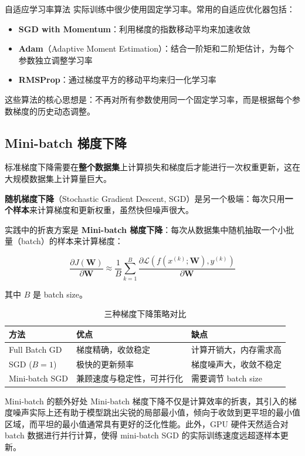 \documentclass[a4paper]{article}
\begin{document}
\begin{importantbox}{自适应学习率算法}
实际训练中很少使用固定学习率。常用的自适应优化器包括：
\begin{itemize}
\item \textbf{SGD with Momentum}：利用梯度的指数移动平均来加速收敛
\item \textbf{Adam}（Adaptive Moment Estimation）：结合一阶矩和二阶矩估计，为每个参数独立调整学习率
\item \textbf{RMSProp}：通过梯度平方的移动平均来归一化学习率
\end{itemize}
这些算法的核心思想是：不再对所有参数使用同一个固定学习率，而是根据每个参数梯度的历史动态调整。
\end{importantbox}

\subsection{Mini-batch 梯度下降}

标准梯度下降需要在\textbf{整个数据集}上计算损失和梯度后才能进行一次权重更新，这在大规模数据集上计算量巨大。

\textbf{随机梯度下降}（Stochastic Gradient Descent, SGD）是另一个极端：每次只用\textbf{一个样本}来计算梯度和更新权重，虽然快但噪声很大。

实践中的折衷方案是 \textbf{Mini-batch 梯度下降}：每次从数据集中随机抽取一个小批量（batch）的样本来计算梯度：

$$\frac{\partial J(\mathbf{W})}{\partial \mathbf{W}} \approx \frac{1}{B}\sum_{k=1}^{B}\frac{\partial \mathcal{L}(f(x^{(k)}; \mathbf{W}), y^{(k)})}{\partial \mathbf{W}}$$

其中 $B$ 是 batch size。

\begin{table}[H]
\centering
\begin{tabular}{lp{4.5cm}p{4.5cm}}
\toprule
\textbf{方法} & \textbf{优点} & \textbf{缺点} \\
\midrule
Full Batch GD & 梯度精确，收敛稳定 & 计算开销大，内存需求高 \\
SGD ($B=1$) & 极快的更新频率 & 梯度噪声大，收敛不稳定 \\
Mini-batch SGD & 兼顾速度与稳定性，可并行化 & 需要调节 batch size \\
\bottomrule
\end{tabular}
\caption{三种梯度下降策略对比}
\end{table}

\begin{knowledgebox}{Mini-batch 的额外好处}
Mini-batch 梯度下降不仅是计算效率的折衷，其引入的梯度噪声实际上还有助于模型跳出尖锐的局部最小值，倾向于收敛到更平坦的最小值区域，而平坦的最小值通常具有更好的泛化性能。此外，GPU 硬件天然适合对 batch 数据进行并行计算，使得 mini-batch SGD 的实际训练速度远超逐样本更新。
\end{knowledgebox}
\end{document}
